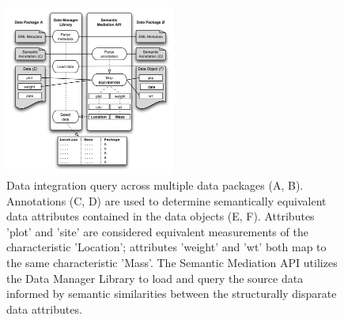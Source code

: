 \begin{figure}
\centering
\includegraphics[width=0.5\textwidth]{images/integration.png}
\caption{Data integration query across multiple data packages (A, B).  Annotations (C, D) are used to determine semantically equivalent data attributes contained in the data objects (E, F). Attributes 'plot' and 'site' are considered equivalent measurements of the characteristic 'Location'; attributes 'weight' and 'wt' both map to the same characteristic 'Mass'. The Semantic Mediation API utilizes the Data Manager Library to load and query the source data informed by semantic similarities between the structurally disparate data attributes.}
\label{fig:integration}
\end{figure}

